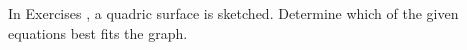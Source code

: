 {\noindent In Exercises}
{, a quadric surface is sketched. Determine which of the given equations best fits the graph.
}
